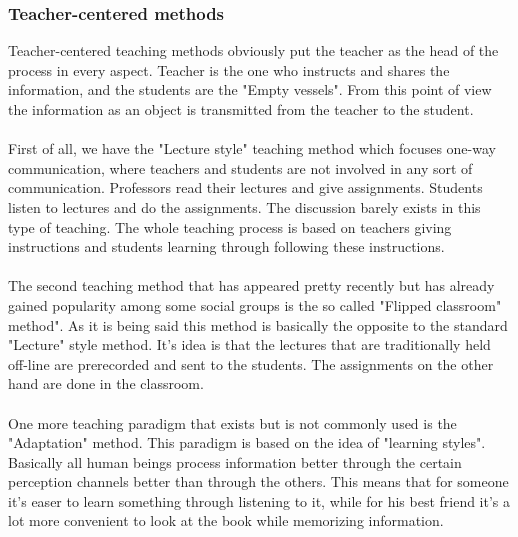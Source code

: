 \documentclass[10pt,oneside,english,a4paper]{article}
\begin{document}
\subsubsection{Teacher-centered methods}
Teacher-centered teaching methods obviously put the teacher as the head of the process in every aspect. Teacher is the one who instructs and shares the information, and the students are the "Empty vessels". \cite{vessel} From this point of view the information as an object is transmitted from the teacher to the student. \paragraph{}
First of all, we have the "Lecture style"  teaching method which focuses one-way communication, where teachers and students are not involved in any sort of communication. Professors read their lectures and give assignments. Students listen to lectures and do the assignments. The discussion barely exists in this type of teaching. The whole teaching process is based on teachers giving instructions and students learning through following these instructions.\paragraph{}
The second teaching method that has appeared pretty recently but has already gained popularity among some social groups is the so called "Flipped classroom" method".\cite{Flipped} As it is being said this method is basically the opposite to the standard "Lecture" style method. It's idea is that the lectures that are traditionally held off-line are prerecorded and sent to the students. The  assignments on the other hand are done in the classroom. \paragraph{}
One more teaching paradigm that exists but is not commonly used is the "Adaptation" method.\cite {Learning} This paradigm is based on the idea of "learning styles". Basically all human beings process information better through the certain perception channels better than through the others. This means that for someone it's easer to learn something through listening to it, while for his best friend it's a lot more convenient to look at the book while memorizing information. 
\end{document}
